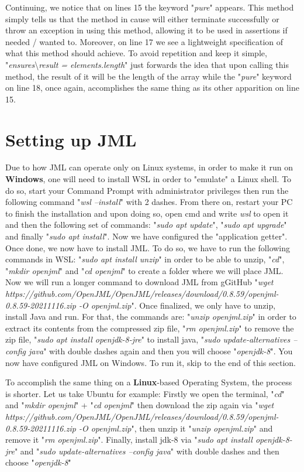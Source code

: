 \documentclass{article}
\begin{document}
Continuing, we notice that on lines 15 the keyword "\textit{pure}" appears. This method simply tells us that the method in cause will either terminate successfully or throw an exception in using this method, allowing it to be used in assertions if needed / wanted to. Moreover, on line 17 we see a lightweight specification of what this method should achieve. To avoid repetition and keep it simple, "\textit{ensures}\textbackslash \textit{result = elements.length}" just forwards the idea that upon calling this method, the result of it will be the length of the array while the "\textit{pure}" keyword on line 18, once again, accomplishes the same thing as its other apparition on line 15.






\section{Setting up JML}
Due to how JML can operate only on Linux systems, in order to make it run on \textbf{Windows}, one will need to install WSL in order to "emulate" a Linux shell. To do so, start your Command Prompt with administrator privileges then run the following command "\textit{wsl --install}" with 2 dashes. From there on, restart your PC to finish the installation and upon doing so, open cmd and write \textit{wsl} to open it and then the following set of commands: "\textit{sudo apt update}", "\textit{sudo apt upgrade}" and finally "\textit{sudo apt install}". Now we have configured the "application getter". Once done, we now have to install JML. To do so, we have to run the following commands in WSL: "\textit{sudo apt install unzip}" in order to be able to unzip, "\textit{cd}", "\textit{mkdir openjml}" and "\textit{cd openjml}" to create a folder where we will place JML. Now we will run a longer command to download JML from gGitHub "\textit{wget https://github.com/OpenJML/OpenJML/releases/download/0.8.59/openjml-0.8.59-20211116.zip -O openjml.zip}". Once finalized, we only have to unzip, install Java and run. For that, the commands are: "\textit{unzip openjml.zip}" in order to extract its contents from the compressed zip file, "\textit{rm openjml.zip}" to remove the zip file, "\textit{sudo apt install openjdk-8-jre}" to install java, "\textit{sudo update-alternatives --config java}" with double dashes again and then you will choose "\textit{openjdk-8}". You now have configured JML on Windows. To run it, skip to the end of this section.

To accomplish the same thing on a \textbf{Linux}-based Operating System, the process is shorter. Let us take Ubuntu for example: Firstly we open the terminal, "\textit{cd}" and "\textit{mkdir openjml}" + "\textit{cd openjml}" then download the zip again via "\textit{wget https://github.com/OpenJML/OpenJML/releases/download/0.8.59/openjml-0.8.59-20211116.zip -O openjml.zip}", then unzip it "\textit{unzip openjml.zip}" and remove it "\textit{rm openjml.zip}". Finally, install jdk-8 via "\textit{sudo apt install openjdk-8-jre}" and "\textit{sudo update-alternatives --config java}" with double dashes and then choose "\textit{openjdk-8}"
\end{document}
